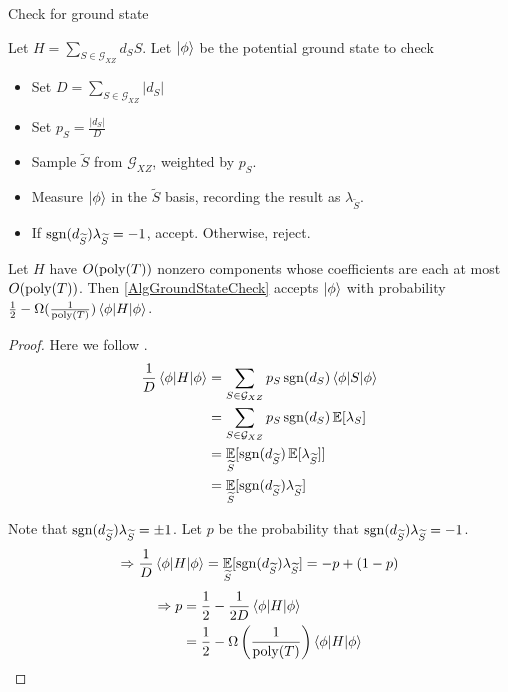 \begin{algorithm}
	\caption{Check for ground state}
	\label{AlgGroundStateCheck}
		Let $H=\sum_{S\in\mathcal{G}_{XZ}} d_S S$.
		Let $\ket\phi$ be the potential ground state to check
		\begin{itemize}
			\item Set $D = \sum_{S\in\mathcal{G}_{XZ}}|d_S|$
			\item Set $p_S = \frac{|d_S|}{D}$
			\item Sample $\widetilde{S}$ from $\mathcal{G}_{XZ}$, weighted by $p_S$.
			\item Measure $\ket\phi$ in the $\widetilde{S}$ basis, recording the result as $\lambda_{\widetilde{S}}$.
			\item If $\operatorname{sgn}(d_{\widetilde{S}})\lambda_{\widetilde{S}}=-1$, accept. Otherwise, reject.
		\end{itemize}
\end{algorithm}

\begin{thm}\label{ThmXZCheck}
	Let $H$ have $O(\operatorname*{\operatorname{poly}}(T))$ nonzero components whose coefficients are each at most $O(\operatorname*{\operatorname{poly}}(T))$.
	Then \autoref{AlgGroundStateCheck} accepts $\ket\phi$ with probability $\frac{1}{2}-\Omega(\frac{1}{\operatorname*{\operatorname{poly}}(T)})\braket{\phi|H|\phi}$.
\end{thm}
\begin{proof}

	Here we follow \cite{PhysRevA.93.022326}.
	\begin{align*}
		\frac{1}{D}\braket{\phi|H|\phi}&=\sum_{S\in\mathcal{G}_{XZ}} p_S\operatorname{sgn}(d_S)\braket{\phi|S|\phi}\\
		&=\sum_{S\in\mathcal{G}_{XZ}} p_S\operatorname{sgn}(d_S)\operatorname*{\mathbb{E}}[\lambda_S]\\
		&=\operatorname*{\mathbb{E}}_{\widetilde{S}}[\operatorname{sgn}(d_{\widetilde{S}})\operatorname*{\mathbb{E}}[\lambda_{\widetilde{S}}]]\\
		&=\operatorname*{\mathbb{E}}_{\widetilde{S}}[\operatorname{sgn}(d_{\widetilde{S}})\lambda_{\widetilde{S}}]
	\end{align*}

	Note that $\operatorname{sgn}(d_{\widetilde{S}})\lambda_{\widetilde{S}}=\pm1$. Let $p$ be the probability that $\operatorname{sgn}(d_{\widetilde{S}})\lambda_{\widetilde{S}}=-1$.
	$$\Rightarrow \frac{1}{D}\braket{\phi|H|\phi}=\operatorname*{\mathbb{E}}_{\widetilde{S}}[\operatorname{sgn}(d_{\widetilde{S}})\lambda_{\widetilde{S}}]=-p+(1-p)$$
	\begin{align*}
		\Rightarrow p&=\frac{1}{2}-\frac{1}{2D}\braket{\phi|H|\phi}\\
		&=\frac{1}{2}-\Omega\left(\frac{1}{\operatorname*{\operatorname{poly}}(T)}\right)\braket{\phi|H|\phi}
	\end{align*}

\end{proof}

